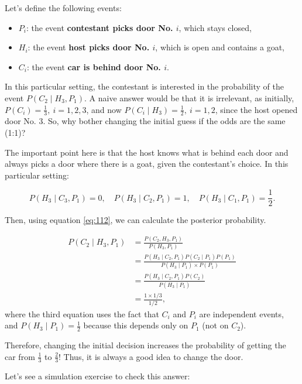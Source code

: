 Let's define the following events: 

\begin{itemize}
	\item \( P_i \): the event \textbf{contestant picks door No. \( i \)}, which stays closed, 
	\item \( H_i \): the event \textbf{host picks door No. \( i \)}, which is open and contains a goat, 
	\item \( C_i \): the event \textbf{car is behind door No. \( i \)}.
\end{itemize}

In this particular setting, the contestant is interested in the probability of the event \( P(C_2 \mid H_3, P_1) \). A naive answer would be that it is irrelevant, as initially, \( P(C_i) = \frac{1}{3}, \ i = 1, 2, 3 \), and now \( P(C_i \mid H_3) = \frac{1}{2}, \ i = 1, 2 \), since the host opened door No. 3. So, why bother changing the initial guess if the odds are the same (1:1)?

The important point here is that the host knows what is behind each door and always picks a door where there is a goat, given the contestant's choice. In this particular setting:

\[
P(H_3 \mid C_3, P_1) = 0, \quad P(H_3 \mid C_2, P_1) = 1, \quad P(H_3 \mid C_1, P_1) = \frac{1}{2}.
\]

Then, using equation \ref{eq:112}, we can calculate the posterior probability.

\begin{align*}
	P(C_2\mid H_3,P_1)&= \frac{P(C_2,H_3,P_1)}{P(H_3,P_1)}\\
	&= \frac{P(H_3\mid C_2,P_1)P(C_2\mid P_1)P(P_1)}{P(H_3\mid P_1)\times P(P_1)}\\
	&= \frac{P(H_3\mid C_2,P_1)P(C_2)}{P(H_3\mid P_1)}\\
	&=\frac{1\times 1/3}{1/2},
\end{align*}
where the third equation uses the fact that \( C_i \) and \( P_i \) are independent events, and \( P(H_3 \mid P_1) = \frac{1}{2} \) because this depends only on \( P_1 \) (not on \( C_2 \)).

Therefore, changing the initial decision increases the probability of getting the car from \( \frac{1}{3} \) to \( \frac{2}{3} \)! Thus, it is always a good idea to change the door.

Let's see a simulation exercise to check this answer:


